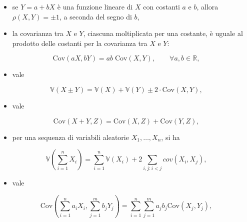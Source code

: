 \documentclass[
  11pt,
]{krantz}
\providecommand{\tightlist}{%
  \setlength{\itemsep}{0pt}\setlength{\parskip}{0pt}}
\newcommand{\Real}{\mathbb{R}} %
\theoremstyle{definition}
\theoremstyle{definition}
\theoremstyle{definition}
\theoremstyle{definition}
\theoremstyle{remark}
\begin{document}
\begin{itemize}
\tightlist
\item
  se \(Y = a + bX\) è una funzione lineare di \(X\) con costanti \(a\) e \(b\), allora \(\rho(X,Y) = \pm 1\), a seconda del segno di \(b\),
\item
  la covarianza tra \(X\) e \(Y\), ciascuna moltiplicata per una costante, è uguale al prodotto delle costanti per la covarianza tra \(X\) e \(Y\):
\end{itemize}

\begin{equation}
\mbox{Cov}(aX,bY) = ab \;\mbox{Cov}(X,Y), \qquad \forall a,b \in \Real,
\end{equation}

\begin{itemize}
\tightlist
\item
  vale
\end{itemize}

\begin{equation}
\mathbb{V}(X \pm Y) = \mathbb{V}(X) + \mathbb{V}(Y) \pm 2 \cdot \mbox{Cov}(X,Y),
\end{equation}

\begin{itemize}
\tightlist
\item
  vale
\end{itemize}

\begin{equation}
\mbox{Cov}(X + Y, Z) = \mbox{Cov}(X,Z) + \mbox{Cov}(Y,Z),
\end{equation}

\begin{itemize}
\tightlist
\item
  per una sequenza di variabili aleatorie \(X_1, \dots, X_n\), si ha
\end{itemize}

\begin{equation}
 \mathbb{V}\left( \sum_{i=1}^n X_i\right) = \sum_{i=1}^n
 \mathbb{V}(X_i) + 2\sum_{i,j: i<j}cov(X_i, X_j),
\end{equation}

\begin{itemize}
\tightlist
\item
  vale
\end{itemize}

\begin{equation}
\mbox{Cov}\left(\sum_{i=1}^n a_i X_i, \sum_{j=1}^m b_jY_j\right) = \sum_{i=1}^n \sum_{j=1}^m a_j b_j\mbox{Cov}(X_j, Y_j),
\end{equation}
\end{document}
